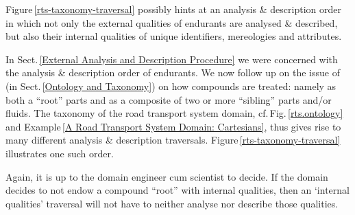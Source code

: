 \label{A Suggested Analysis and Description Approach II}

\begynd
\pind Figure\,\vref{rts-taxonomy-traversal} possibly hints at an analysis \&
      description order in which
\begynd
\pind not only the external qualities of endurants are analysed \& described,
\pind but also their internal qualities of unique identifiers,
      mereologies and attributes.
\afslut

\pind In Sect.\,\vref{External Analysis and Description Procedure}
      we were concerned with the analysis \& description order of
      endurants.
\mnewfoil\LLLL\HHHH
\pind We now follow up on the issue of  (in Sect.\,\vref{Ontology and
      Taxonomy}) on how compounds are 
      treated: namely as both a ``root'' parts and as a composite of
      two or more ``sibling'' parts and/or fluids.
\begynd
\pind The taxonomy of the road transport system domain,
      cf.\,Fig.\,\vref{rts.ontology} and Example\,\vref{A Road Transport System Domain: Cartesians},
      thus gives rise to many different analysis \& description traversals.
\pind Figure\,\vref{rts-taxonomy-traversal} illustrates one such order.

\mnewfoil
\mnewfoil
    
\pind Again, it is up to the  domain engineer cum scientist to decide. 
\begynd
\pind If the domain  decides to not endow
      a compound ``root'' with internal qualities,
\pind then an `internal qualities' traversal
      will not have to neither analyse
      nor describe those qualities.
\afslut
\afslut
\afslut


\label{A Domain Discovery Process, II.n}

\label{chap4.Summary Remarks}\label{I:Summary}

